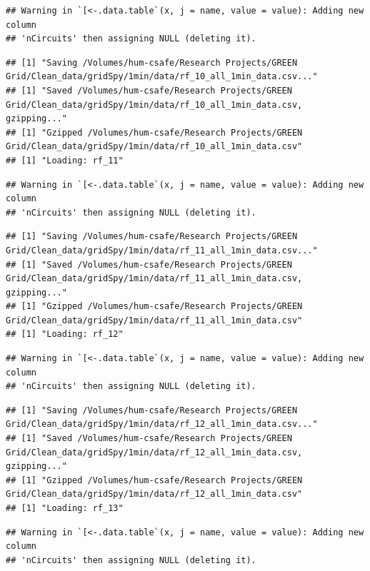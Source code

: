 \documentclass[]{article}
\begin{document}
\begin{verbatim}
## Warning in `[<-.data.table`(x, j = name, value = value): Adding new column
## 'nCircuits' then assigning NULL (deleting it).
\end{verbatim}

\begin{verbatim}
## [1] "Saving /Volumes/hum-csafe/Research Projects/GREEN Grid/Clean_data/gridSpy/1min/data/rf_10_all_1min_data.csv..."
## [1] "Saved /Volumes/hum-csafe/Research Projects/GREEN Grid/Clean_data/gridSpy/1min/data/rf_10_all_1min_data.csv, gzipping..."
## [1] "Gzipped /Volumes/hum-csafe/Research Projects/GREEN Grid/Clean_data/gridSpy/1min/data/rf_10_all_1min_data.csv"
## [1] "Loading: rf_11"
\end{verbatim}

\begin{verbatim}
## Warning in `[<-.data.table`(x, j = name, value = value): Adding new column
## 'nCircuits' then assigning NULL (deleting it).
\end{verbatim}

\begin{verbatim}
## [1] "Saving /Volumes/hum-csafe/Research Projects/GREEN Grid/Clean_data/gridSpy/1min/data/rf_11_all_1min_data.csv..."
## [1] "Saved /Volumes/hum-csafe/Research Projects/GREEN Grid/Clean_data/gridSpy/1min/data/rf_11_all_1min_data.csv, gzipping..."
## [1] "Gzipped /Volumes/hum-csafe/Research Projects/GREEN Grid/Clean_data/gridSpy/1min/data/rf_11_all_1min_data.csv"
## [1] "Loading: rf_12"
\end{verbatim}

\begin{verbatim}
## Warning in `[<-.data.table`(x, j = name, value = value): Adding new column
## 'nCircuits' then assigning NULL (deleting it).
\end{verbatim}

\begin{verbatim}
## [1] "Saving /Volumes/hum-csafe/Research Projects/GREEN Grid/Clean_data/gridSpy/1min/data/rf_12_all_1min_data.csv..."
## [1] "Saved /Volumes/hum-csafe/Research Projects/GREEN Grid/Clean_data/gridSpy/1min/data/rf_12_all_1min_data.csv, gzipping..."
## [1] "Gzipped /Volumes/hum-csafe/Research Projects/GREEN Grid/Clean_data/gridSpy/1min/data/rf_12_all_1min_data.csv"
## [1] "Loading: rf_13"
\end{verbatim}

\begin{verbatim}
## Warning in `[<-.data.table`(x, j = name, value = value): Adding new column
## 'nCircuits' then assigning NULL (deleting it).
\end{verbatim}
\end{document}

